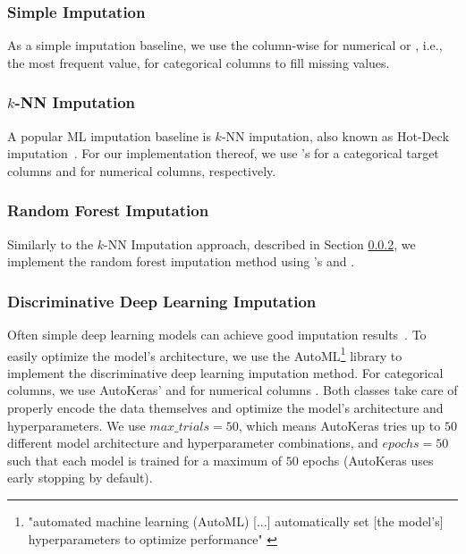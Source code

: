 \subsubsection{Simple Imputation}
\label{sec:simple_imputation}
%
As a simple imputation baseline, we use the column-wise  for numerical or , i.e., the most frequent value,  for categorical columns to fill missing values.


\subsubsection{$k$-NN Imputation}
\label{sec:knKNN}
%
A popular ML imputation baseline is $k$-NN imputation, also known as Hot-Deck imputation~\citep{Batista2003}. For our implementation thereof, we use 's  for a categorical target columns and  for numerical columns, respectively.


\subsubsection{Random Forest Imputation}
%
Similarly to the $k$-NN Imputation approach, described in Section \ref{sec:knKNN}, we implement the random forest imputation method using 's  and .



\subsubsection{Discriminative Deep Learning Imputation}
\label{sec:dl_imputation}
%
Often simple deep learning models can achieve good imputation results~\citep{Biessmann2018a}. To easily optimize the model's architecture, we use the AutoML\footnote{"automated machine learning (AutoML) [...] automatically set [the model's] hyperparameters to optimize performance" \cite{AutoML}} library  \citep{AutoKeras} to implement the discriminative deep learning imputation method.
For categorical columns, we use AutoKeras'  and for numerical columns . Both classes take care of properly encode the data themselves and optimize the model's architecture and hyperparameters. We use $max\_trials = 50$, which means AutoKeras tries up to $50$ different model architecture and hyperparameter combinations, and $epochs = 50$ such that each model is trained for a maximum of $50$ epochs (AutoKeras uses early stopping by default).


